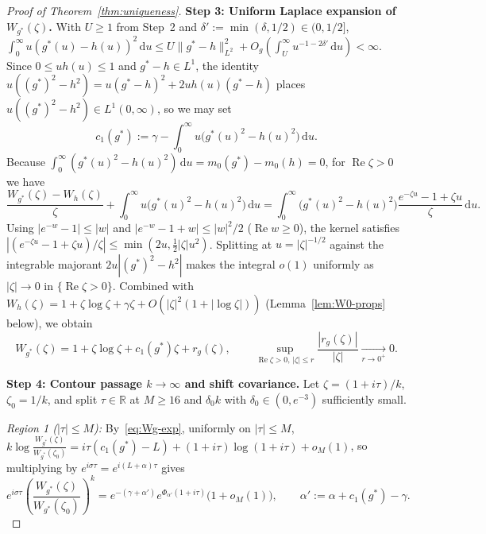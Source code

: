 \documentclass[11pt, reqno]{amsart}
\theoremstyle{remark}
\numberwithin{equation}{section}
\DeclareMathOperator{\re}{Re}
\newcommand{\R}{\mathbb{R}}
\newcommand{\dd}{\,\mathrm{d}}
\begin{document}
\begin{proof}[Proof of Theorem~\ref{thm:uniqueness}]
\smallskip
\noindent\textbf{Step 3: Uniform Laplace expansion of $W_{g^*}(\zeta)$.}
With $U \ge 1$ from Step~2 and $\delta' := \min(\delta, 1/2) \in (0, 1/2]$,
$\int_0^\infty u(g^*(u)-h(u))^2\dd u \le U\|g^*-h\|_{L^2}^2 + O_g(\int_U^\infty u^{-1-2\delta'}\dd u) < \infty$.
Since $0 \le u h(u) \le 1$ and $g^*-h \in L^1$, the identity
$u((g^*)^2 - h^2) = u(g^*-h)^2 + 2u h(u)(g^*-h)$ places $u((g^*)^2-h^2) \in L^1(0,\infty)$, so we may set
\[
c_1(g^*) := \gamma - \int_0^\infty u\bigl(g^*(u)^2 - h(u)^2\bigr)\dd u.
\]
Because $\int_0^\infty (g^*(u)^2 - h(u)^2)\dd u = m_0(g^*) - m_0(h) = 0$, for $\re\zeta > 0$ we have
\[
\frac{W_{g^*}(\zeta) - W_h(\zeta)}{\zeta} + \int_0^\infty u\bigl(g^*(u)^2 - h(u)^2\bigr)\dd u
= \int_0^\infty \bigl(g^*(u)^2 - h(u)^2\bigr)\frac{e^{-\zeta u} - 1 + \zeta u}{\zeta}\dd u.
\]
Using $|e^{-w}-1| \le |w|$ and $|e^{-w}-1+w| \le |w|^2/2$ ($\re w \ge 0$), the kernel satisfies
$|(e^{-\zeta u}-1+\zeta u)/\zeta| \le \min(2u, \frac{1}{2}|\zeta| u^2)$. Splitting at $u = |\zeta|^{-1/2}$
against the integrable majorant $2u|(g^*)^2-h^2|$ makes the integral $o(1)$ uniformly as $|\zeta| \to 0$
in $\{\re\zeta > 0\}$. Combined with $W_h(\zeta) = 1 + \zeta\log\zeta + \gamma\zeta + O(|\zeta|^2(1+|\log\zeta|))$
(Lemma~\ref{lem:W0-props} below), we obtain
\begin{equation}\label{eq:Wg-exp}
W_{g^*}(\zeta) = 1 + \zeta\log\zeta + c_1(g^*)\zeta + r_g(\zeta),
\qquad \sup_{\re\zeta > 0,\, |\zeta| \le r} \frac{|r_g(\zeta)|}{|\zeta|} \xrightarrow[r\to 0^+]{} 0.
\end{equation}

\smallskip
\noindent\textbf{Step 4: Contour passage $k \to \infty$ and shift covariance.}
Let $\zeta = (1+i\tau)/k$, $\zeta_0 = 1/k$, and split $\tau \in \R$ at $M \ge 16$ and $\delta_0 k$
with $\delta_0 \in (0, e^{-3})$ sufficiently small.

\emph{Region 1 ($|\tau| \le M$):} By~\eqref{eq:Wg-exp}, uniformly on $|\tau| \le M$,
$k\log\frac{W_{g^*}(\zeta)}{W_{g^*}(\zeta_0)} = i\tau(c_1(g^*)-L) + (1+i\tau)\log(1+i\tau) + o_M(1)$,
so multiplying by $e^{i\sigma\tau} = e^{i(L+\alpha)\tau}$ gives
\[
e^{i\sigma\tau}\left(\frac{W_{g^*}(\zeta)}{W_{g^*}(\zeta_0)}\right)^{\!k}
= e^{-(\gamma+\alpha')} e^{\Phi_{\alpha'}(1+i\tau)}\bigl(1 + o_M(1)\bigr),
\qquad \alpha' := \alpha + c_1(g^*) - \gamma.
\]


\end{proof}
\end{document}

